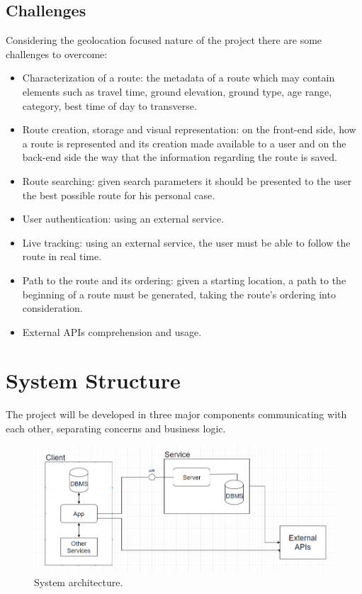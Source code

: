 \documentclass{article}
\begin{document}
        \subsection{Challenges}
            
            Considering the geolocation focused nature of the project there are some challenges to overcome:

            \begin{itemize}
                \item Characterization of a route: the metadata of a route which may contain elements such as travel time, ground elevation, ground type, age range, category, best time of day to transverse.
                \item Route creation, storage and visual representation: on the front-end side, how a route is represented and its creation made available to a user and on the back-end side the way that the information regarding the route is saved.
                \item Route searching: given search parameters it should be presented to the user the best possible route for his personal case.  
                \item User authentication: using an external service.
                \item Live tracking: using an external service, the user must be able to follow the route in real time.
                \item Path to the route and its ordering: given a starting location, a path to the beginning of a route must be generated, taking the route's ordering into consideration.
                \item External APIs comprehension and usage.
            \end{itemize}

    \section{System Structure}
        The project will be developed in three major components communicating with each other, separating concerns and business logic.
        
        \begin{figure}[h]            
            \includegraphics[width=\textwidth]{images/project-structure/system-structure.PNG}
            \caption{System architecture.}
        \end{figure}  
\end{document}
